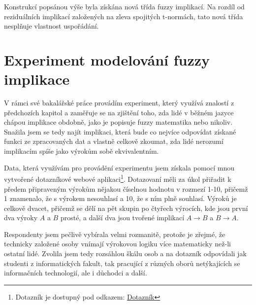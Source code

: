 \begin{corollary}
    Konstrukcí popsánou výše byla získána nová třída fuzzy implikací. Na rozdíl od reziduálních implikací založených na zleva spojitých t-normách, tato nová třída nespl\v nuje vlastnost uspořádání.
\end{corollary}


\chapter{Experiment modelování fuzzy implikace}
V rámci své bakalářské práce provádím experiment, který využívá znalostí z předchozích kapitol a zaměřuje se na zjištění toho, zda lidé v běžném jazyce chápou implikace obdobně, jako je popisuje fuzzy matematika nebo nikoliv. Snažila jsem se tedy najít implikaci, která bude co nejvíce odpovídat získané funkci ze zpracovaných dat a vlastně celkově zkoumat, zda lidé nerozumí implikacím spíše jako výrok\r um sobě ekvivalentním.

Data, která využívám pro provádění experimentu jsem získala pomocí mnou vytvořené dotazníkové webové aplikaci\footnote{Dotazník je dostupný pod odkazem: \href{https://www.stud.fit.vutbr.cz/~xjirmu00/bp/}{Dotazník}}. Dotazovaní měli za \' ukol přiřadit k předem připraveným výrok\r um nějakou číselnou hodnotu v rozmezí 1-10, přičemž 1 znamenalo, že s výrokem nesouhlasí a 10, že s ním plně souhlasí. Výrok\r u je celkově dvacet, přičemž se dělí na pět skupin po čtyřech výrocích, kde jsou první dva výroky $A$ a $B$ prosté, a další dva jsou tvořené implikací $A \to B$ a $B \to A$.

Respondenty jsem pečlivě vybírala velmi rozmanitě, protože je zřejmé, že technicky založené osoby vnímají výrokovou logiku více matematicky než-li ostatní lidé. Zvolila jsem tedy rozsáhlou škálu osob a na dotazník odpovídali jak studenti z informatických fakult, tak pracující z r\r uzných obor\r u netýkajících se informačních technologií, ale i d\r uchodci a další.

